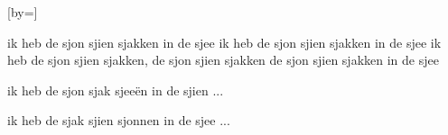  

[by=]




\beginverse
    ik heb de sjon sjien sjakken in de sjee
    ik heb de sjon sjien sjakken in de sjee
    ik heb de sjon sjien sjakken, de sjon sjien sjakken
    de sjon sjien sjakken in de sjee
\endverse

\beginverse
    ik heb de sjon sjak sjee\"en in de sjien ...
\endverse

\beginverse
    ik heb de sjak sjien sjonnen in de sjee ...
\endverse




\endsong
